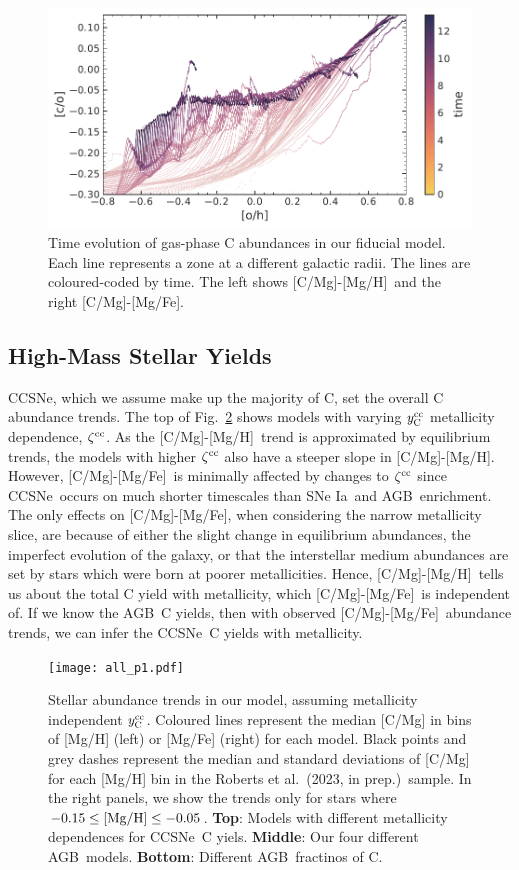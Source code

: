 \documentclass[fleqn,
usenatbib]{mnras}
\newcommand{\citetjack}{Roberts et al.~(2023, in prep.)}
\newcommand{\agb}{AGB}
\newcommand{\cc}{CCSNe}
\newcommand{\ia}{SNe Ia}
\newcommand{\caah}{[C/Mg]-[Mg/H]}
\newcommand{\caafe}{[C/Mg]-[Mg/Fe]}
\newcommand{\Ycc}{\ensuremath{y_{\rm C}^{\rm cc}}}
\begin{document}
\begin{figure}
\centering
\includegraphics{all_the_tracks.pdf}
\caption[]{
    Time evolution of gas-phase C abundances in our fiducial model.
    Each line represents a zone at a different galactic radii. The lines are coloured-coded by time. The left shows \caah\ and the right \caafe. 
}
\label{fig:c_evo}
\end{figure}




\subsection{High-Mass Stellar Yields}\label{sec:results_highmass}

\cc, which we assume make up the majority of C, set the overall C abundance trends.
The top of Fig.~\ref{fig:first_models} shows models with varying $\Ycc$ metallicity dependence, $\zeta^{\rm cc}$. As the \caah~trend is approximated by equilibrium trends, the models with higher $\zeta^{\rm cc}$ also have a steeper slope in \caah. 
However, \caafe~is minimally affected by changes to $\zeta^{\rm cc}$ since \cc\ occurs on much shorter timescales than \ia\ and \agb\ enrichment. The only effects on \caafe, when considering the narrow metallicity slice, are because of either the slight change in equilibrium abundances, the imperfect evolution of the galaxy, or that the interstellar medium abundances are set by stars which were born at poorer metallicities. 
 Hence, \caah\ tells us about the total C yield with metallicity, which \caafe\ is independent of. If we know the \agb\ C yields, then with observed \caafe\ abundance trends, we can infer the \cc\ C yields with metallicity.


\begin{figure}
\texttt{[image: all\_p1.pdf]}

\caption[]{
    Stellar abundance trends in our model, assuming metallicity independent $\Ycc$. Coloured lines represent the median [C/Mg] in bins of [Mg/H] (left) or [Mg/Fe] (right) for each model. Black points and grey dashes represent the median and standard deviations of [C/Mg] for each [Mg/H] bin in the \citetjack~sample. In the right panels, we show the trends only for stars where $-0.15\leq {\rm [Mg/H]}\leq -0.05$.
    \textbf{Top}: Models with different metallicity dependences for  \cc\ C yiels.
    \textbf{Middle}: Our four different \agb\ models.
    \textbf{Bottom}: Different \agb\ fractinos of C.
}
\label{fig:first_models}
\end{figure}
\end{document}
